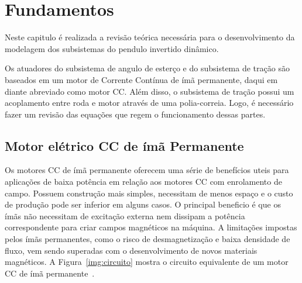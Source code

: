 \chapter{Fundamentos}
    \label{chp:fundamentos}
    
    Neste capitulo é realizada a revisão teórica necessária para o desenvolvimento da modelagem dos subsistemas do pendulo invertido dinâmico.
    
    Os atuadores do subsistema de angulo de esterço e do subsistema de tração são baseados em um motor de Corrente Contínua de ímã permanente, daqui em diante abreviado como motor CC. Além disso, o subsistema de tração possui um acoplamento entre roda e motor através de uma polia-correia. Logo, é necessário fazer um revisão das equações que regem o funcionamento dessas partes.
    
	\section{Motor elétrico CC de ímã Permanente} \label{sec:motorcc}

        Os motores CC de ímã permanente oferecem uma série de benefícios uteis para aplicações de baixa potência em relação aos motores CC com enrolamento de campo. Possuem construção mais simples, necessitam de menos espaço e o custo de produção pode ser inferior em alguns casos. O principal beneficio é que os ímãs não necessitam de excitação externa nem dissipam a potência correspondente para criar campos magnéticos na máquina. A limitações impostas pelos ímãs permanentes, como o risco de desmagnetização e baixa densidade de fluxo, vem sendo superadas com o desenvolvimento de novos materiais magnéticos. A Figura~\ref{img:circuito} mostra o circuito equivalente de um motor CC de ímã permanente~\cite{book:fitzgerald}.
        
